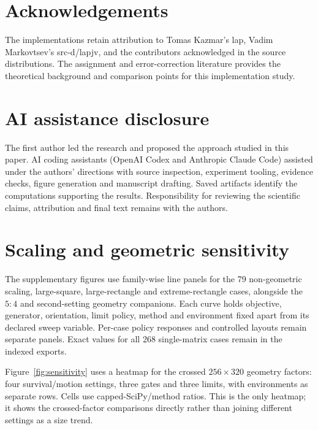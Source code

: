 \documentclass[11pt,a4paper]{article}
\begin{document}
\FloatBarrier
\section*{Acknowledgements}

The implementations retain attribution to Tomas Kazmar's lap, Vadim Markovtsev's src-d/lapjv, and the contributors acknowledged in the source distributions. The assignment and error-correction literature provides the theoretical background and comparison points for this implementation study.

\FloatBarrier
\section*{AI assistance disclosure}

The first author led the research and proposed the approach studied in this paper. AI coding assistants (OpenAI Codex and Anthropic Claude Code) assisted under the authors' directions with source inspection, experiment tooling, evidence checks, figure generation and manuscript drafting. Saved artifacts identify the computations supporting the results. Responsibility for reviewing the scientific claims, attribution and final text remains with the authors.

\FloatBarrier
\renewcommand{\bibfont}{\small}
\setlength{\bibsep}{0pt plus 1pt}



\FloatBarrier
\clearpage
\appendix
\section{Scaling and geometric sensitivity}\label{app:scaling}

The supplementary figures use family-wise line panels for the 79 non-geometric scaling, large-square, large-rectangle and extreme-rectangle cases, alongside the $5:4$ and second-setting geometry companions. Each curve holds objective, generator, orientation, limit policy, method and environment fixed apart from its declared sweep variable. Per-case policy responses and controlled layouts remain separate panels. Exact values for all 268 single-matrix cases remain in the indexed exports.









\FloatBarrier
Figure~\ref{fig:sensitivity} uses a heatmap for the crossed $256\times320$ geometry factors: four survival/motion settings, three gates and three limits, with environments as separate rows. Cells use capped-SciPy/method ratios. This is the only heatmap; it shows the crossed-factor comparisons directly rather than joining different settings as a size trend.
\end{document}
